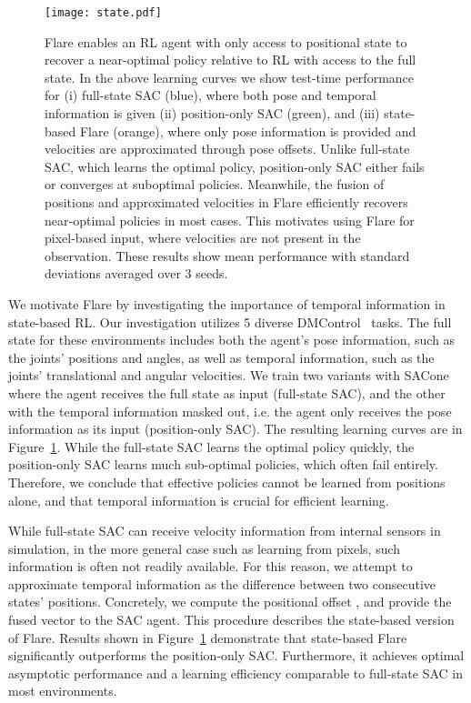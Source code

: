 \documentclass{article} \usepackage{iclr2021_conference,times}
\begin{document}
\begin{figure}[h]
\begin{center}
\centering
\texttt{[image: state.pdf]}
\end{center}
\vspace{-3mm}
\small
\caption{Flare enables an RL agent with only access to positional state to recover a near-optimal policy relative to RL with access to the full state. In the above learning curves we show test-time performance for (i) full-state SAC (blue), where both pose and temporal information is given (ii) position-only SAC (green), and (iii) state-based Flare (orange), where only pose information is provided and velocities are approximated through pose offsets. Unlike full-state SAC, which learns the optimal policy, position-only SAC either fails or converges at suboptimal policies. Meanwhile, the fusion of positions and approximated velocities in Flare efficiently recovers near-optimal policies in most cases. This motivates using Flare for pixel-based input, where velocities are not present in the observation. These results show mean performance with standard deviations averaged over 3 seeds.}
\label{fig:state_sac}
\vspace{-3mm}
\end{figure}
We motivate Flare by investigating the importance of temporal information in state-based RL. Our investigation utilizes 5 diverse DMControl~\citep{tassa2018deepmind} tasks. The full state for these environments includes both the agent's pose information, such as the joints' positions and angles, as well as temporal information, such as the joints' translational and angular velocities. We train two variants with SAC\textemdash one where the agent receives the full state as input (full-state SAC), and the other with the temporal information masked out, i.e. the agent only receives the pose information as its input (position-only SAC). The resulting learning curves are in Figure~\ref{fig:state_sac}. While the full-state SAC learns the optimal policy quickly, the position-only SAC learns much sub-optimal policies, which often fail entirely.
Therefore, we conclude that effective policies cannot be learned from positions alone, and that temporal information is crucial for efficient learning.

While full-state SAC can receive velocity information from internal sensors in simulation, in the more general case such as learning from pixels, such information is often not readily available. For this reason, we attempt to approximate temporal information as the difference between two consecutive states' positions. Concretely, we compute the positional offset , and provide the fused vector  to the SAC agent. This procedure describes the state-based version of Flare. Results shown in Figure~\ref{fig:state_sac} demonstrate that state-based Flare significantly outperforms the position-only SAC. Furthermore, it achieves optimal asymptotic performance and a learning efficiency comparable to full-state SAC in most environments. 
\end{document}
